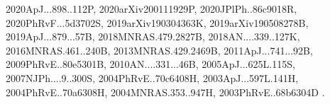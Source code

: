 \documentclass[12pt]{article}
\begin{document}
\begin{enumerate}
\begin{enumerate}
{2020ApJ...898..112P,%
2020arXiv200111929P,%
2020JPlPh..86c9018R,%
2020PhRvF...5d3702S,%
2019arXiv190304363K,%
2019arXiv190508278B,%
2019ApJ...879...57B,%
2018MNRAS.479.2827B,%
2018AN....339..127K,%
2016MNRAS.461..240B,%
2013MNRAS.429.2469B,%
2011ApJ...741...92B,%
2009PhRvE..80e5301B,%
2010AN....331...46B,%
2005ApJ...625L.115S,%
2007NJPh....9..300S,%
2004PhRvE..70c6408H,%
2003ApJ...597L.141H,%
2004PhRvE..70a6308H,%
2004MNRAS.353..947H,%
2003PhRvE..68b6304D%
}.


\end{enumerate}
\end{enumerate}
\end{document}
